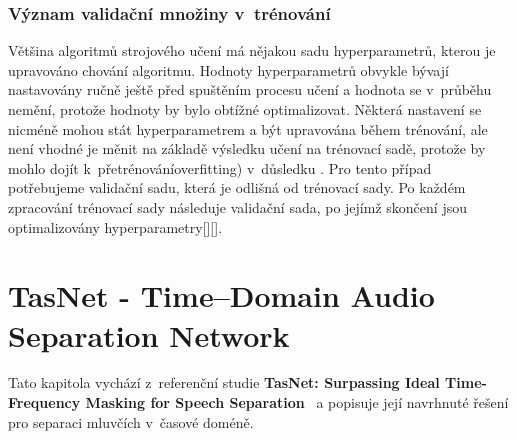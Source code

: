 \subsection{Význam validační množiny v~trénování}
Většina algoritmů strojového učení má nějakou sadu hyperparametrů, kterou je upravováno chování algoritmu. Hodnoty hyperparametrů obvykle bývají nastavovány ručně ještě před spuštěním procesu učení a hodnota se v~průběhu nemění, protože hodnoty by bylo obtížné optimalizovat. 
Některá nastavení se nicméně mohou stát hyperparametrem a být upravována během trénování, ale není vhodné je měnit na základě výsledku učení na trénovací sadě, protože by mohlo dojít k~přetrénováníoverfitting) v~důsledku . Pro tento případ potřebujeme validační sadu, která je odlišná od trénovací sady.
Po každém zpracování trénovací sady následuje validační sada, po jejímž skončení jsou optimalizovány hyperparametry[][].







\chapter{TasNet - Time--Domain Audio Separation Network}
\label{tasnet}

Tato kapitola vychází z~referenční studie \textbf{TasNet: Surpassing Ideal Time-Frequency Masking for Speech Separation}~\cite{luo2018convtasnet} a popisuje její navrhnuté řešení pro separaci mluvčích v~časové doméně.

